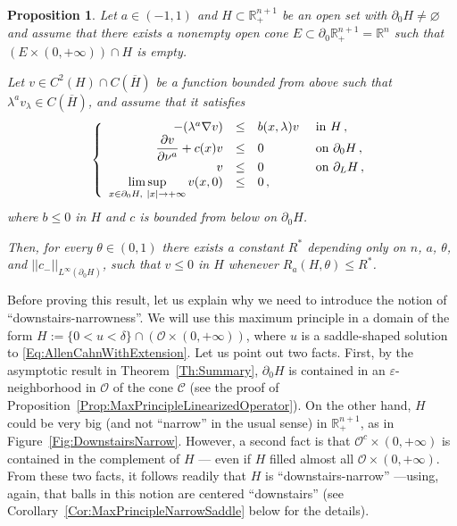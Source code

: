\documentclass[12pt,reqno]{amsart}
\newtheorem{proposition}[theorem]{Proposition}
\theoremstyle{definition}
\theoremstyle{remark}
\newcommand{\con}[1]{\mathbb{#1}}
\newcommand{\R}{\con{R}} %
\newcommand{\ccal}{\mathscr{C}}
\newcommand{\ocal}{\mathcal{O}}
\newcommand{\norm}[1]{\left | \left |{#1} \right | \right |}
\newcommand\beqc[1]{\left\{\begin{array}{#1}}
\newcommand\eeqc{\end{array} \right.}
\def\PDEsystem{rcll}
\let\div\relax
\DeclareMathOperator{\div}{div}
\def\ds{\displaystyle}
\numberwithin{equation}{section}
\begin{document}
\begin{proposition}
\label{Prop:MaxPrincipleNarrow}
Let $a\in (-1,1)$ and $H \subset \R^{n+1}_+$ be an open set with $\partial_0 H \neq \varnothing$ and assume that there exists a nonempty open cone $E\subset \partial_0 \R^{n+1}_+ = \R^n$ such that $(E \times (0,+\infty))\cap H$ is empty. 

Let $v \in C^2 (H)\cap C(\overline{H})$ be a function bounded from above such that $\lambda^a v_\lambda \in C (\overline{H})$, and assume that it satisfies
\begin{equation}
\label{Eq:MaxPrincipleNarrow}
	\beqc{\PDEsystem}
	-\div(\lambda^a \nabla v) &\leq& b(x,\lambda) v & \text{ in } H\,, \\
	\dfrac{\partial v}{\partial \nu^a}  + c(x) v &\leq & 0 & \text{ on } \partial_0 H \,, \\
	v & \leq & 0 & \text{ on } \partial_L H\,,\\
	\ds \limsup_{x \in \partial_0H,\ |x|\to +\infty} v(x,0) & \leq & 0\,,
	\eeqc
\end{equation}
where $b \leq 0$ in $H$ and $c$ is bounded from below on $\partial_0 H$.

Then, for every $\theta \in (0,1)$ there exists a constant $R^*$ depending only on $n$, $a$, $\theta$, and $\norm{c_-}_{L^\infty(\partial_0 H)}$, such that $v\leq 0 $ in $H$ whenever $R_a(H,\theta) \leq R^*$.
\end{proposition}


Before proving this result, let us explain why we need to introduce the notion of ``downstairs-narrowness''\!. We will use this maximum principle in a domain of the form $H:=\{0<u<\delta\}\cap \left(\ocal\times (0,+\infty)\right) $, where $u$ is a saddle-shaped solution to \eqref{Eq:AllenCahnWithExtension}. Let us point out two facts. First, by the asymptotic result in Theorem~\ref{Th:Summary}, $\partial_0H$ is contained in an $\varepsilon$-neighborhood in $\ocal$ of the cone $\ccal$ (see the proof of Proposition~\ref{Prop:MaxPrincipleLinearizedOperator}). On the other hand, $H$ could  be very big (and not ``narrow'' in the usual sense) in $\R^{n+1}_+$, as in Figure~\ref{Fig:DownstairsNarrow}. However, a second fact is that $\ocal^c\times (0,+\infty)$ is contained in the complement of $H$ --- even if $H$ filled almost all $\ocal\times (0,+\infty)$. From these two facts, it follows readily that $H$ is ``downstairs-narrow'' ---using, again, that balls in this notion are centered ``downstairs'' (see Corollary~\ref{Cor:MaxPrincipleNarrowSaddle} below for the details).
\end{document}
